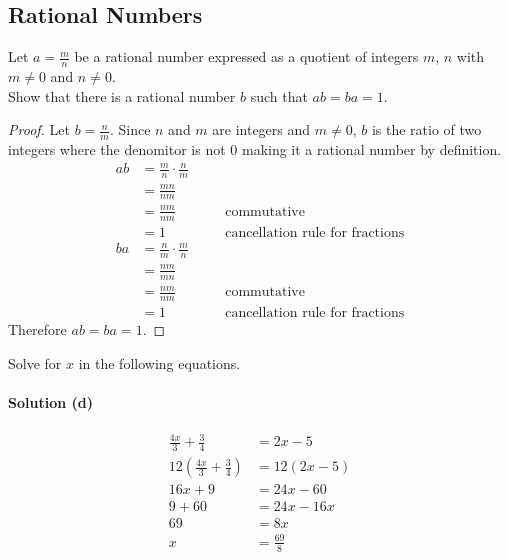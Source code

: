 \subsection{Rational Numbers}

\begin{tcolorbox}[title=Problem 4, breakable]
Let $a = \frac{m}{n}$ be a rational number expressed as a quotient of integers $m$, $n$
with $m \not = 0$ and $n \not = 0$. \\
Show that there is a rational number $b$ such that $ab = ba = 1$.
\end{tcolorbox}

\begin{proof}
Let $b = \frac{n}{m}$. Since $n$ and $m$ are integers and $m \not = 0$, 
$b$ is the ratio of two integers where the denomitor is not $0$ 
making it a rational number by definition.
\begin{align*}
ab &= \frac{m}{n} \cdot \frac{n}{m} && \\
&= \frac{mn}{nm} && \\
&= \frac{nm}{nm} && \quad \text{commutative} \\
&= 1 && \quad \text{cancellation rule for fractions}
\end{align*}
\begin{align*}
ba &= \frac{n}{m} \cdot \frac{m}{n} && \\
&= \frac{nm}{mn} && \\
&= \frac{nm}{nm} && \quad \text{commutative} \\
&= 1 && \quad \text{cancellation rule for fractions}
\end{align*}
Therefore $ab = ba = 1$.
\end{proof}

\begin{tcolorbox}[title=Problem 6, breakable]
Solve for $x$ in the following equations.
\end{tcolorbox}

\paragraph{Solution (d)}
\begin{align*}
\frac{4x}{3} + \frac{3}{4} &= 2x - 5 \\
12\left(\frac{4x}{3} + \frac{3}{4}\right) &= 12(2x - 5) \\
16x + 9 &= 24x - 60 \\
9 + 60 &= 24x - 16x \\
69 &= 8x \\
x &= \frac{69}{8}
\end{align*}

